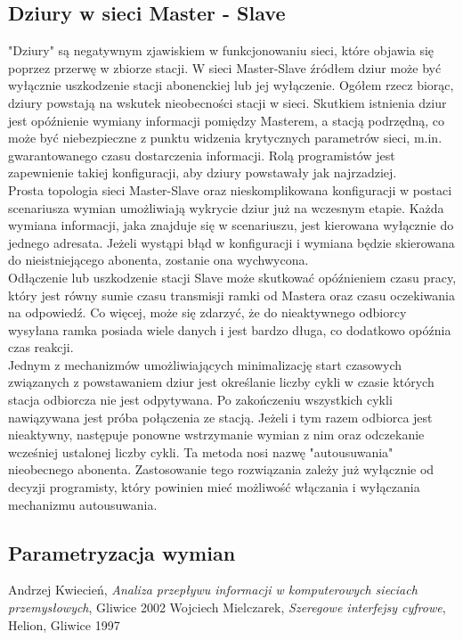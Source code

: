 \documentclass[a4paper,twoside]{article}
\begin{document}
\subsection{Dziury w sieci Master - Slave}
"Dziury" są negatywnym zjawiskiem w funkcjonowaniu sieci, które objawia się poprzez przerwę w zbiorze stacji. W sieci Master-Slave źródłem dziur może być wyłącznie uszkodzenie stacji abonenckiej lub jej wyłączenie. Ogółem rzecz biorąc, dziury powstają na wskutek nieobecności stacji w sieci. Skutkiem istnienia dziur jest opóźnienie wymiany informacji pomiędzy Masterem, a stacją podrzędną, co może być niebezpieczne z punktu widzenia krytycznych parametrów sieci, m.in. gwarantowanego czasu dostarczenia informacji. Rolą programistów jest zapewnienie takiej konfiguracji, aby dziury powstawały jak najrzadziej.\\
Prosta topologia sieci Master-Slave oraz nieskomplikowana konfiguracji w postaci scenariusza wymian umożliwiają wykrycie dziur już na wczesnym etapie. Każda wymiana informacji, jaka znajduje się w scenariuszu, jest kierowana wyłącznie do jednego adresata. Jeżeli wystąpi błąd w konfiguracji i wymiana będzie skierowana do nieistniejącego abonenta, zostanie ona wychwycona.\\
Odłączenie lub uszkodzenie stacji Slave może skutkować opóźnieniem czasu pracy, który jest równy sumie czasu transmisji ramki od Mastera oraz czasu oczekiwania na odpowiedź. Co więcej, może się zdarzyć, że do nieaktywnego odbiorcy wysyłana ramka posiada wiele danych i jest bardzo długa, co dodatkowo opóźnia czas reakcji.\\
Jednym z mechanizmów umożliwiających minimalizację start czasowych związanych z powstawaniem dziur jest określanie liczby cykli w czasie których stacja odbiorcza nie jest odpytywana. Po zakończeniu wszystkich cykli nawiązywana jest próba połączenia ze stacją. Jeżeli i tym razem odbiorca jest nieaktywny, następuje ponowne wstrzymanie wymian z nim oraz odczekanie wcześniej ustalonej liczby cykli. Ta metoda nosi nazwę "autousuwania" nieobecnego abonenta. Zastosowanie tego rozwiązania zależy już wyłącznie od decyzji programisty, który powinien mieć możliwość włączania i wyłączania mechanizmu autousuwania.


\subsection{Parametryzacja wymian}










\newpage
\begin{thebibliography}{2}
	 Andrzej Kwiecień, \textit{Analiza przepływu informacji w komputerowych sieciach przemysłowych}, Gliwice 2002
	 Wojciech Mielczarek, \textit{Szeregowe interfejsy cyfrowe}, Helion, Gliwice 1997
\end{thebibliography}
\end{document}
